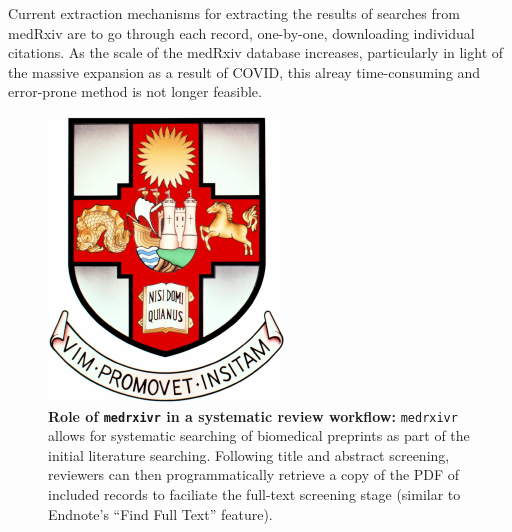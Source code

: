 \documentclass[a4paper, twoside]{templates/ociamthesis}
\begin{document}
Current extraction mechanisms for extracting the results of searches from medRxiv are to go through each record, one-by-one, downloading individual citations. As the scale of the medRxiv database increases, particularly in light of the massive expansion as a result of COVID, this alreay time-consuming and error-prone method is not longer feasible.





\begin{figure}
\includegraphics[width=1\linewidth]{figures/UoBcrest} \caption[Role of \texttt{medrxivr} in a systematic review workflow]{\textbf{Role of \texttt{medrxivr} in a systematic review workflow:} \texttt{medrxivr} allows for systematic searching of biomedical preprints as part of the initial literature searching. Following title and abstract screening, reviewers can then programmatically retrieve a copy of the PDF of included records to faciliate the full-text screening stage (similar to Endnote's ``Find Full Text'' feature).}\label{fig:medrxivr-sr}
\end{figure}
\end{document}
